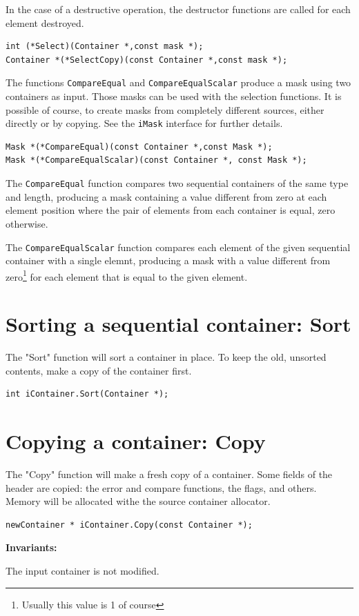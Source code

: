 \documentclass[12pt,a4paper]{memoir} %
\newcommand{\Const}{
{\par\noindent \textbf{Invariants:}\noindent}
}
\begin{document}
In the case of a destructive operation, the destructor functions are called for each element destroyed.
\begin{verbatim}
int (*Select)(Container *,const mask *);
Container *(*SelectCopy)(const Container *,const mask *);
\end{verbatim}

The functions \verb,CompareEqual, and \verb,CompareEqualScalar, produce a mask using two containers as input. Those masks can be used with the selection functions. It is possible of course, to create masks from completely different sources, either directly or by copying. See the \verb,iMask, interface for further details.

\begin{verbatim}
Mask *(*CompareEqual)(const Container *,const Mask *);
Mask *(*CompareEqualScalar)(const Container *, const Mask *);
\end{verbatim}


The \verb,CompareEqual, function compares two sequential containers of the same type and length, producing a mask containing a value different from zero at each element position where the pair of elements from each container is equal, zero otherwise.

The \verb,CompareEqualScalar, function compares each element of the given sequential container with a single elemnt, producing a mask with a value 
different from zero\footnote{Usually this value is 1 of course} for each element that is equal to the given element.
\section{Sorting a sequential container: Sort}
The "Sort" function will sort a container in place. To keep the old, unsorted contents, make a copy of the container first.
\begin{verbatim}
int iContainer.Sort(Container *);
\end{verbatim}
\section{Copying a container: Copy}
\noindent The "Copy" function will make a fresh copy of a container. Some fields of the header are copied: the error and compare functions, the flags, and others. Memory will be allocated withe the source container allocator.
\begin{verbatim}
newContainer * iContainer.Copy(const Container *);
\end{verbatim}
\Const The input container is not modified.
\end{document}
